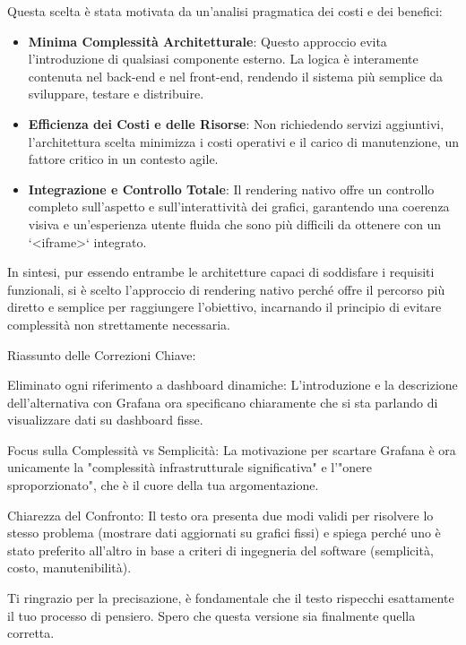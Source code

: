Questa scelta è stata motivata da un'analisi pragmatica dei costi e dei benefici:
\begin{itemize}
    \item \textbf{Minima Complessità Architetturale}: Questo approccio evita l'introduzione di qualsiasi componente esterno. La logica è interamente contenuta nel back-end e nel front-end, rendendo il sistema più semplice da sviluppare, testare e distribuire.
    \item \textbf{Efficienza dei Costi e delle Risorse}: Non richiedendo servizi aggiuntivi, l'architettura scelta minimizza i costi operativi e il carico di manutenzione, un fattore critico in un contesto agile.
    \item \textbf{Integrazione e Controllo Totale}: Il rendering nativo offre un controllo completo sull'aspetto e sull'interattività dei grafici, garantendo una coerenza visiva e un'esperienza utente fluida che sono più difficili da ottenere con un `<iframe>` integrato.
\end{itemize}

In sintesi, pur essendo entrambe le architetture capaci di soddisfare i requisiti funzionali, si è scelto l'approccio di rendering nativo perché offre il percorso più diretto e semplice per raggiungere l'obiettivo, incarnando il principio di evitare complessità non strettamente necessaria.

Riassunto delle Correzioni Chiave:

Eliminato ogni riferimento a dashboard dinamiche: L'introduzione e la descrizione dell'alternativa con Grafana ora specificano chiaramente che si sta parlando di visualizzare dati su dashboard fisse.

Focus sulla Complessità vs Semplicità: La motivazione per scartare Grafana è ora unicamente la "complessità infrastrutturale significativa" e l'"onere sproporzionato", che è il cuore della tua argomentazione.

Chiarezza del Confronto: Il testo ora presenta due modi validi per risolvere lo stesso problema (mostrare dati aggiornati su grafici fissi) e spiega perché uno è stato preferito all'altro in base a criteri di ingegneria del software (semplicità, costo, manutenibilità).

Ti ringrazio per la precisazione, è fondamentale che il testo rispecchi esattamente il tuo processo di pensiero. Spero che questa versione sia finalmente quella corretta.